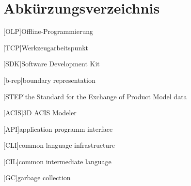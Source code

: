 \documentclass[14pt,a4paper,titlepage]{article}
\begin{document}
	\section*{Abkürzungsverzeichnis}
	\begin{acronym}[OLP]
		[OLP]{Offline-Programmierung}
	\end{acronym}
	\begin{acronym}[TCP]
		[TCP]{Werkzeugarbeitspunkt}
	\end{acronym}
	\begin{acronym}[SDK]
		[SDK]{Software Development Kit}
	\end{acronym}
	\begin{acronym}[b-rep]
		[b-rep]{boundary representation}
	\end{acronym}
	\begin{acronym}[step]
		{the Standard for the Exchange of Product Model data}
	\end{acronym}
	\begin{acronym}[acis]
		{3D ACIS Modeler}
	\end{acronym}
	\begin{acronym}[api]
		[API]{application programm interface}
	\end{acronym}
	\begin{acronym}[cli]
		[CLI]{common language infrastructure}
	\end{acronym}
	\begin{acronym}[cil]
		[CIL]{common intermediate language}
	\end{acronym}
	\begin{acronym}[gc]
	[GC]{garbage collection}
	\end{acronym}
\end{document}
